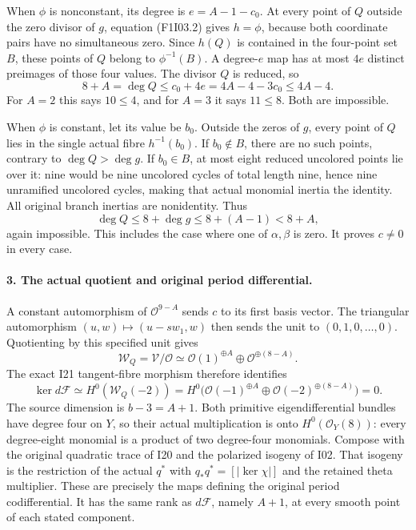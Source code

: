 When $\phi$ is nonconstant, its degree is
$e=A-1-c_0$. At every point of $Q$ outside the zero divisor
of $g$, equation (F1I03.2) gives $h=\phi$, because both
coordinate pairs have no simultaneous zero. Since $h(Q)$
is contained in the four-point set $B$, these points of $Q$
belong to $\phi^{-1}(B)$. A degree-$e$ map has at most
$4e$ distinct preimages of those four values. The divisor
$Q$ is reduced, so
\[
       8+A=\deg Q\le c_0+4e
          =4A-4-3c_0\le4A-4.                       \tag{F1I03.3}
\]
For $A=2$ this says $10\le4$, and for $A=3$ it says
$11\le8$. Both are impossible.

When $\phi$ is constant, let its value be $b_0$.
Outside the zeros of $g$, every point of $Q$ lies in the
single actual fibre $h^{-1}(b_0)$. If $b_0\notin B$,
there are no such points, contrary to $\deg Q>\deg g$.
If $b_0\in B$, at most eight reduced uncolored points lie
over it: nine would be nine uncolored cycles of total
length nine, hence nine unramified uncolored cycles, making
that actual monomial inertia the identity. All original
branch inertias are nonidentity. Thus
\[
             \deg Q\le8+\deg g\le8+(A-1)<8+A,
\]
again impossible. This includes the case where one of
$\alpha,\beta$ is zero. It proves $c\ne0$ in every case.

\paragraph{3. The actual quotient and original period differential.}
A constant automorphism of $\mathcal O^{9-A}$ sends $c$
to its first basis vector. The triangular automorphism
$(u,w)\mapsto(u-s w_1,w)$ then sends the unit to
$(0,1,0,\ldots,0)$. Quotienting by this specified unit gives
\[
       \mathcal W_Q=\mathcal V/\mathcal O
          \simeq\mathcal O(1)^{\oplus A}
                 \oplus\mathcal O^{\oplus(8-A)}.    \tag{F1I03.4}
\]
The exact I21 tangent-fibre morphism therefore identifies
\[
 \ker d\mathcal F\simeq H^0(\mathcal W_Q(-2))
       =H^0\bigl(\mathcal O(-1)^{\oplus A}
                    \oplus\mathcal O(-2)^{\oplus(8-A)}\bigr)=0.
\]
The source dimension is $b-3=A+1$. Both primitive
eigendifferential bundles have degree four on $Y$, so their
actual multiplication is onto $H^0(\mathcal O_Y(8))$:
every degree-eight monomial is a product of two degree-four
monomials. Compose with the original quadratic trace of I20
and the polarized isogeny of I02. That isogeny is the
restriction of the actual $q^*$ with
$q_*q^*=[|\ker\chi|]$ and the retained theta multiplier.
These are precisely the maps defining the original period
codifferential. It has the same rank as $d\mathcal F$,
namely $A+1$, at every smooth point of each stated component.


